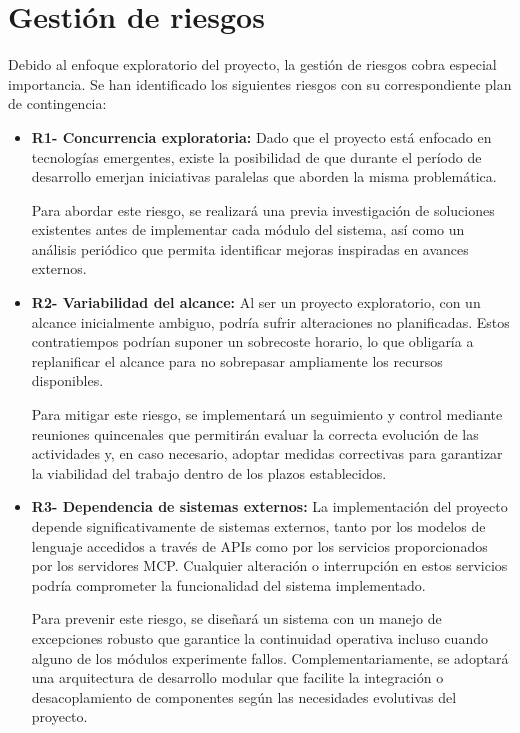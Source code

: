 \section{Gestión de riesgos}

Debido al enfoque exploratorio del proyecto, la gestión de riesgos cobra especial importancia. Se han identificado los siguientes riesgos con su correspondiente plan de contingencia: 

\begin{itemize}
  \item\textbf{R1- Concurrencia exploratoria: }Dado que el proyecto está enfocado en tecnologías emergentes, existe la posibilidad de que durante el período de desarrollo emerjan iniciativas paralelas que aborden la misma problemática.  

Para abordar este riesgo, se realizará una previa investigación de soluciones existentes antes de implementar cada módulo del sistema, así como un análisis periódico que permita identificar mejoras inspiradas en avances externos.

\item\textbf{R2- Variabilidad del alcance: }Al ser un proyecto exploratorio, con un alcance inicialmente ambiguo, podría sufrir alteraciones no planificadas. Estos contratiempos podrían suponer un sobrecoste horario, lo que obligaría a replanificar el alcance para no sobrepasar ampliamente los recursos disponibles.

Para mitigar este riesgo, se implementará un seguimiento y control mediante reuniones quincenales que permitirán evaluar la correcta evolución de las actividades y, en caso necesario, adoptar medidas correctivas para garantizar la viabilidad del trabajo dentro de los plazos establecidos.


\item\textbf{R3- Dependencia de sistemas externos: }La implementación del proyecto depende significativamente de sistemas externos, tanto por los modelos de lenguaje accedidos a través de APIs como por los servicios proporcionados por los servidores MCP. Cualquier alteración o interrupción en estos servicios podría comprometer la funcionalidad del sistema implementado.

Para prevenir este riesgo, se diseñará un sistema con un manejo de excepciones robusto que garantice la continuidad operativa incluso cuando alguno de los módulos experimente fallos. Complementariamente, se adoptará una arquitectura de desarrollo modular que facilite la integración o desacoplamiento de componentes según las necesidades evolutivas del proyecto.


\end{itemize}
